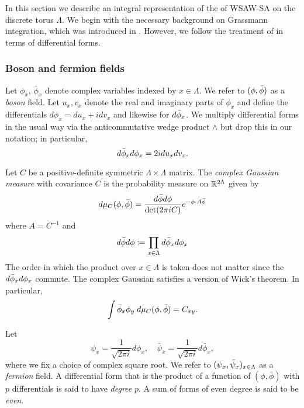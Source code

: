 In this section we describe an integral representation of the of WSAW-SA on the
discrete torus $\Lambda$. We begin with the necessary background on Grassmann
integration, which was introduced in \cite{Bere66}. However, we follow the
treatment of \cite{BIS09} in terms of differential forms.

\subsubsection{Boson and fermion fields}
\label{sec:forms}

Let $\phi_x$, $\bar\phi_x$ denote complex variables indexed by $x\in\Lambda$.
We refer to $(\phi, \bar\phi)$ as a \emph{boson} field. Let $u_x, v_x$ denote
the real and imaginary parts of $\phi_x$ and define the differentials
$d\phi_x = du_x + i dv_x$ and likewise for $d\bar\phi_x$.
We multiply differential forms in the usual way via the anticommutative wedge product
$\wedge$ but drop this in our notation; in particular,
\begin{equation}
d\bar\phi_x d\phi_x = 2 i du_x dv_x.
\end{equation}

\begin{example}
Let $C$ be a positive-definite symmetric $\Lambda\times\Lambda$ matrix. The
\emph{complex Gaussian measure} with covariance $C$ is the probability measure
on ${\mathbb R}^{2\Lambda}$ given by
\begin{equation}
d\mu_C(\phi, \bar\phi)
	=
\frac{d\bar\phi d\phi}{\det(2\pi i C)} e^{-\phi \cdot A \bar\phi}
\end{equation}
where $A = C^{-1}$ and
\begin{equation}
d\bar\phi d\phi \coloneqq \prod_{x\in\Lambda} d\bar\phi_x d\phi_x
\end{equation}
The order in which the product over $x\in\Lambda$ is taken does not matter
since the $d\bar\phi_x d\phi_x$ commute. The complex Gaussian satisfies a
version of Wick's theorem. In particular,
\begin{equation}
\label{e:wick-complex2}
\int \bar\phi_x \phi_y \; d\mu_C(\phi, \bar\phi) = C_{xy}.
\end{equation}
\end{example}

Let
\begin{equation}
\psi_x = \frac{1}{\sqrt{2\pi i}} d\phi_x,
\quad
\bar\psi_x = \frac{1}{\sqrt{2\pi i}} d\bar\phi_x,
\end{equation}
where we fix a choice of complex square root. We refer to $(\psi_x, \bar\psi_x)_{x\in\Lambda}$
as a \emph{fermion} field.
A differential form that is the
product of a function of $(\phi, \bar\phi)$
with $p$ differentials is said to have \emph{degree} $p$.
A sum of forms of even degree is said to be \emph{even}.

